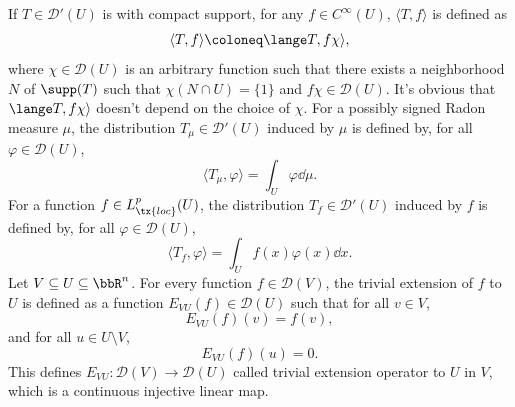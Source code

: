 \documentclass[a4paper,12pt]{report}
\begin{document}
If $T\in\mathcal{D}'(U)$ is with compact support, for any $f\in C^{\infty}(U)$, $\langle T,f\rangle$ is defined as
\[\langle T,f\rangle\coloneq\lange T,f\chi\rangle,\]
where $\chi\in\mathcal{D}(U)$ is an arbitrary function such that there exists a neighborhood $N$ of $\supp(T)$ such that $\chi(N\cap U)=\{1\}$ and $f\chi\in\mathcal{D}(U)$. It's obvious that $\lange T,f\chi\rangle$ doesn't depend on the choice of $\chi$.
For a possibly signed Radon measure $\mu$, the distribution $T_{\mu}\in\mathcal{D}'(U)$ induced by $\mu$ is defined by, for all $\varphi\in\mathcal{D}(U)$,
\[\langle T_{\mu},\varphi\rangle=\int_U\varphi\dd{\mu}.\]
For a function $f\in L^p_{\tx{loc}}(U)$, the distribution $T_f\in\mathcal{D}'(U)$ induced by $f$ is defined by, for all $\varphi\in\mathcal{D}(U)$,
\[\langle T_f,\varphi\rangle=\int_Uf(x)\varphi(x)\dd{x}.\]
Let $V\subseteq U\subseteq\bbR^n$. For every function $f\in\mathcal{D}(V)$, the trivial extension of $f$ to $U$ is defined as a function $E_{VU}(f)\in\mathcal{D}(U)$ such that for all $v\in V$,
\[E_{VU}(f)(v)=f(v),\]
and for all $u\in U\setminus V$,
\[E_{VU}(f)(u)=0.\]
This defines $E_{VU}\colon\mathcal{D}(V)\to\mathcal{D}(U)$ called trivial extension operator to $U$ in $V$, which is a continuous injective linear map.
\end{document}
